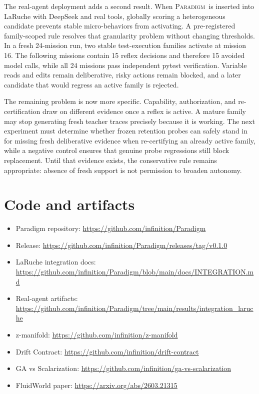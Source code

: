 \documentclass[10pt]{article}
\newcommand{\paradigm}{\textsc{Paradigm}}
\begin{document}
The real-agent deployment adds a second result. When \paradigm\ is inserted into LaRuche with DeepSeek and real tools, globally scoring a heterogeneous candidate prevents stable micro-behaviors from activating. A pre-registered family-scoped rule resolves that granularity problem without changing thresholds. In a fresh 24-mission run, two stable test-execution families activate at mission 16. The following missions contain 15 reflex decisions and therefore 15 avoided model calls, while all 24 missions pass independent pytest verification. Variable reads and edits remain deliberative, risky actions remain blocked, and a later candidate that would regress an active family is rejected.

The remaining problem is now more specific. Capability, authorization, and re-certification draw on different evidence once a reflex is active. A mature family may stop generating fresh teacher traces precisely because it is working. The next experiment must determine whether frozen retention probes can safely stand in for missing fresh deliberative evidence when re-certifying an already active family, while a negative control ensures that genuine probe regressions still block replacement. Until that evidence exists, the conservative rule remains appropriate: absence of fresh support is not permission to broaden autonomy.

\section*{Code and artifacts}
\begin{itemize}
  \item Paradigm repository: \url{https://github.com/infinition/Paradigm}
  \item Release: \url{https://github.com/infinition/Paradigm/releases/tag/v0.1.0}
  \item LaRuche integration docs: \url{https://github.com/infinition/Paradigm/blob/main/docs/INTEGRATION.md}
  \item Real-agent artifacts: \url{https://github.com/infinition/Paradigm/tree/main/results/integration_laruche}
  \item z-manifold: \url{https://github.com/infinition/z-manifold}
  \item Drift Contract: \url{https://github.com/infinition/drift-contract}
  \item GA vs Scalarization: \url{https://github.com/infinition/ga-vs-scalarization}
  \item FluidWorld paper: \url{https://arxiv.org/abs/2603.21315}
\end{itemize}
\end{document}
